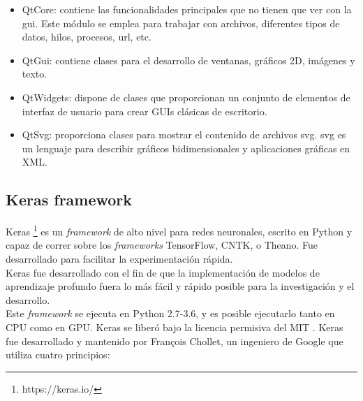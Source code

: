 \begin{itemize}
\item QtCore: contiene las funcionalidades principales que no tienen que ver con la \acrshort{gui}. Este módulo se emplea para trabajar con archivos, diferentes tipos de datos, hilos, procesos, url, etc.

\item QtGui: contiene clases para el desarrollo de ventanas, gráficos 2D, imágenes y texto.

\item QtWidgets: dispone de clases que proporcionan un conjunto de elementos de interfaz de usuario para crear GUIs clásicas de escritorio. 

\item QtSvg: proporciona clases para mostrar el contenido de archivos \acrfull{svg}. \acrshort{svg} es un lenguaje para describir gráficos bidimensionales y aplicaciones gráficas en XML.
\end{itemize}


\subsection{Keras framework}

Keras \footnote{https://keras.io/} es un \textit{framework} de alto nivel para redes neuronales, escrito en Python y capaz de correr sobre los \textit{frameworks} TensorFlow, CNTK, o Theano. Fue desarrollado para facilitar la experimentación rápida. \\

Keras fue desarrollado con el fin de que la implementación de modelos de aprendizaje profundo fuera lo  más fácil y rápido posible para la investigación y el desarrollo.\\

Este \textit{framework} se ejecuta en Python 2.7-3.6, y es posible ejecutarlo tanto en CPU como en GPU. Keras se liberó bajo la licencia permisiva del MIT \cite{Keras_license}. Keras fue desarrollado y mantenido por François Chollet, un ingeniero de Google que utiliza cuatro principios:

